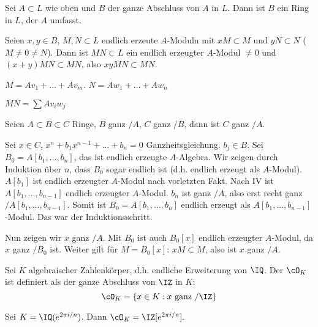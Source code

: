 \begin{Fakt}
 Sei $A\subset L$ wie oben und $B$ der ganze Abschluss von $A$ in $L$. Dann ist $B$ ein Ring in $L$, der $A$ umfasst.
\end{Fakt}

\begin{Beweis}
 Seien $x,y\in B$, $M,N\subset L$ endlich erzeute $A$-Moduln mit $xM\subset M$ und $yN\subset N$ ($M\neq 0 \neq N$).
 Dann ist $MN\subset L$ ein endlich erzeugter $A$-Modul $\neq 0$ und $(x+y)MN\subset MN$, also $xyMN\subset MN$.
\end{Beweis}

\begin{Bemerkung}
 $M=Av_1+\ldots + Av_m$. $N=Aw_1+\ldots+Aw_n$
 
 \folge $MN=\sum Av_iw_j$
\end{Bemerkung}

\begin{Fakt}
 Seien $A\subset B\subset C$ Ringe, $B$ ganz $/A$, $C$ ganz $/B$, dann ist $C$ ganz $/A$.
\end{Fakt}

\begin{Beweis}
 Sei $x\in C$, $x^n+b_1x^{n-1}+\ldots+b_n=0$ Ganzheitsgleichung. $b_j\in B$. Sei $B_0=A[b_1,\ldots,b_n]$, das ist endlich erzeugte $A$-Algebra. Wir zeigen durch Induktion über $n$, dass $B_0$ sogar endlich ist (d.h. endlich erzeugt als $A$-Modul). $A[b_1]$ ist endlich erzeugter $A$-Modul nach vorletzten Fakt.
 Nach IV ist $A[b_1,\ldots,b_{n-1}]$ endlich erzeugter $A$-Modul. $b_n$ ist ganz $/A$, also erst recht ganz $/A[b_1,\ldots,b_{n-1}]$. Somit ist $B_0=A[b_1,\ldots,b_n]$ endlich erzeugt als $A[b_1,\ldots,b_{n-1}]$-Modul. Das war der Induktionsschritt.
 
 Nun zeigen wir $x$ ganz $/A$. Mit $B_0$ ist auch $B_0[x]$ endlich erzeugter $A$-Modul, da $x$ ganz $/B_0$ ist. Weiter gilt für $M=B_0[x]$: $xM\subset M$, also ist $x$ ganz $/A$.
\end{Beweis}

\begin{Definition}
 Sei $K$ algebraischer Zahlenkörper, d.h. endliche Erweiterung von $\IQ$. Der  $\cO_K$ ist definiert als der ganze Abschluss von $\IZ$ in $K$:
 \[\cO_K=\{ x\in K: x \mbox{ ganz } /\IZ\} \]
\end{Definition}

\begin{Beispiel}
 Sei $K=\IQ(e^{2\pi i/n})$. Dann $\cO_K=\IZ[e^{2\pi i/n}].$
\end{Beispiel}

